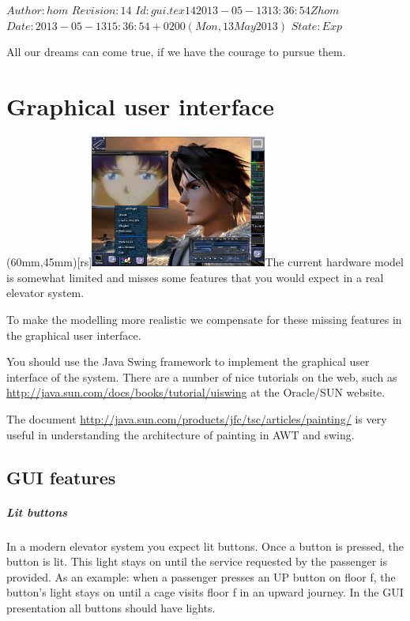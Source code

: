 \renewcommand\TheFile{gui.tex}
\SVN $Author: hom $
\SVN $Revision: 14 $
\SVN $Id: gui.tex 14 2013-05-13 13:36:54Z hom $
\SVN $Date: 2013-05-13 15:36:54 +0200 (Mon, 13 May 2013) $
\SVN $State: Exp $
\begin{savequote}[8cm]
  \sffamily
  All our dreams can come true, if we have the courage to pursue them.
\end{savequote}
\chapter{Graphical user interface}

\parpic(60mm,45mm)[rs]{\includegraphics[width=58mm]{figures/gui-preview-02.jpg}}The current hardware model is somewhat limited and misses some
features that you would expect in a real elevator system.

To make the modelling more realistic we compensate for these missing
features in the graphical user interface.

You should use the Java Swing framework to implement the graphical
user interface of the system. There are a number of nice tutorials on
the web, such as \url{http://java.sun.com/docs/books/tutorial/uiswing}
at the Oracle/SUN website.

The document
\url{http://java.sun.com/products/jfc/tsc/articles/painting/} is 
very useful in understanding the architecture of painting in AWT and
swing.
 
\section{GUI features}

\paragraph{Lit buttons} In a modern elevator system you expect lit
buttons. Once a button is pressed, the button is lit. This light
stays on until the service requested by the passenger is
provided. As an example: when a passenger presses an UP button on
floor f, the button's light stays on until a cage visits floor f in
an upward journey. In the GUI presentation all buttons should have
lights.

